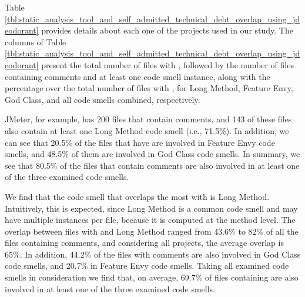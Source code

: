 {Table \ref{tbl:static_analysis_tool_and_self_admitted_technical_debt_overlap_using_jdeodorant} provides details about each one of the projects used in our study. The columns of Table \ref{tbl:static_analysis_tool_and_self_admitted_technical_debt_overlap_using_jdeodorant} present the total number of files with \SATD, followed by the number of files containing \SATD comments and at least one code smell instance,
along with the percentage over the total number of files with \SATD, for Long Method, Feature Envy, God Class, and all code smells combined, respectively. 

JMeter, for example, has 200 files that contain \SATD comments, and 143 of these files also contain at least one Long Method code smell (i.e., 71.5\%). In addition, we can see that 20.5\% of the files that have \SATD are involved in Feature Envy code smells, and 48.5\% of them are involved in God Class code smells. In summary, we see that 80.5\% of the files that contain \SATD comments are also involved in at least one of the three examined code smells.     

We find that the code smell that overlaps the most with \SATD is Long Method. Intuitively, this is expected, since Long Method is a common code smell and may have multiple instances per file, because it is computed at the method level. The overlap between files with \SATD and Long Method ranged from 43.6\% to 82\% of all the files containing \SATD comments, and considering all projects, the average overlap is 65\%. In addition, 44.2\% of the files with \SATD comments are also involved in God Class code smells, and 20.7\% in Feature Envy code smells. Taking all examined code smells in consideration we find that, on average, 69.7\% of files containing \SATD are also involved in at least one of the three examined code smells. 


}
